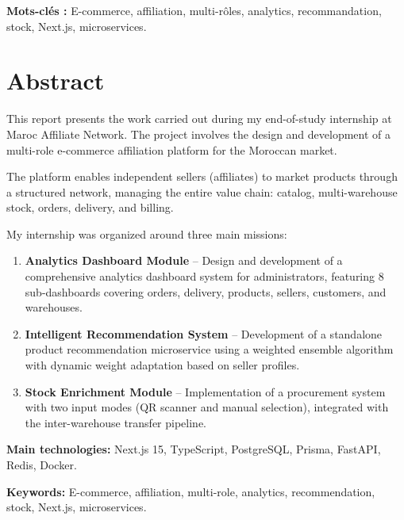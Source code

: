 \documentclass[12pt,a4paper,openany]{report}
\begin{document}
\textbf{Mots-clés :} E-commerce, affiliation, multi-rôles, analytics, recommandation, stock, Next.js, microservices.

\newpage

\chapter*{Abstract}

This report presents the work carried out during my end-of-study internship at Maroc Affiliate Network. The project involves the design and development of a multi-role e-commerce affiliation platform for the Moroccan market.

The platform enables independent sellers (affiliates) to market products through a structured network, managing the entire value chain: catalog, multi-warehouse stock, orders, delivery, and billing.

My internship was organized around three main missions:

\begin{enumerate}
  \item \textbf{Analytics Dashboard Module} -- Design and development of a comprehensive analytics dashboard system for administrators, featuring 8 sub-dashboards covering orders, delivery, products, sellers, customers, and warehouses.

  \item \textbf{Intelligent Recommendation System} -- Development of a standalone product recommendation microservice using a weighted ensemble algorithm with dynamic weight adaptation based on seller profiles.

  \item \textbf{Stock Enrichment Module} -- Implementation of a procurement system with two input modes (QR scanner and manual selection), integrated with the inter-warehouse transfer pipeline.
\end{enumerate}

\textbf{Main technologies:} Next.js 15, TypeScript, PostgreSQL, Prisma, FastAPI, Redis, Docker.

\textbf{Keywords:} E-commerce, affiliation, multi-role, analytics, recommendation, stock, Next.js, microservices.

\newpage

\tableofcontents
\end{document}
